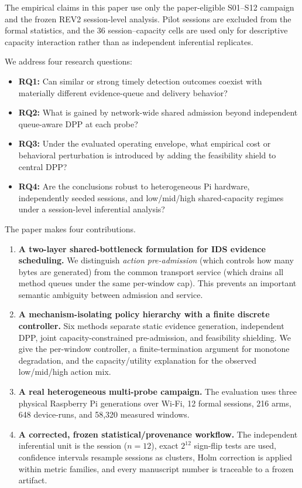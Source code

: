 \documentclass[10pt,journal]{IEEEtran}
\begin{document}
The empirical claims in this paper use only the paper-eligible S01--S12 campaign and the frozen REV2 session-level analysis. Pilot sessions are excluded from the formal statistics, and the 36 session--capacity cells are used only for descriptive capacity interaction rather than as independent inferential replicates.

We address four research questions:
\begin{itemize}[leftmargin=1.2em]
    \item \textbf{RQ1:} Can similar or strong timely detection outcomes coexist with materially different evidence-queue and delivery behavior?
    \item \textbf{RQ2:} What is gained by network-wide shared admission beyond independent queue-aware DPP at each probe?
    \item \textbf{RQ3:} Under the evaluated operating envelope, what empirical cost or behavioral perturbation is introduced by adding the feasibility shield to central DPP?
    \item \textbf{RQ4:} Are the conclusions robust to heterogeneous Pi hardware, independently seeded sessions, and low/mid/high shared-capacity regimes under a session-level inferential analysis?
\end{itemize}

The paper makes four contributions.
\begin{enumerate}[leftmargin=1.4em]
    \item \textbf{A two-layer shared-bottleneck formulation for IDS evidence scheduling.} We distinguish \emph{action pre-admission} (which controls how many bytes are generated) from the common transport service (which drains all method queues under the same per-window cap). This prevents an important semantic ambiguity between admission and service.
    \item \textbf{A mechanism-isolating policy hierarchy with a finite discrete controller.} Six methods separate static evidence generation, independent DPP, joint capacity-constrained pre-admission, and feasibility shielding. We give the per-window controller, a finite-termination argument for monotone degradation, and the capacity/utility explanation for the observed low/mid/high action mix.
    \item \textbf{A real heterogeneous multi-probe campaign.} The evaluation uses three physical Raspberry Pi generations over Wi-Fi, 12 formal sessions, 216 arms, 648 device-runs, and 58,320 measured windows.
    \item \textbf{A corrected, frozen statistical/provenance workflow.} The independent inferential unit is the session ($n=12$), exact $2^{12}$ sign-flip tests are used, confidence intervals resample sessions as clusters, Holm correction is applied within metric families, and every manuscript number is traceable to a frozen artifact.
\end{enumerate}
\end{document}
